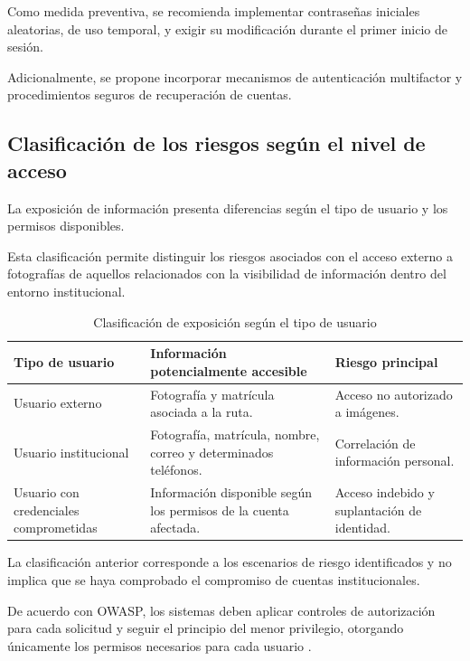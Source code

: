 \documentclass[12pt]{article}
\begin{document}
Como medida preventiva, se recomienda
implementar contraseñas iniciales
aleatorias, de uso temporal, y exigir
su modificación durante el primer
inicio de sesión.

Adicionalmente, se propone incorporar
mecanismos de autenticación multifactor
y procedimientos seguros de recuperación
de cuentas.


\subsection{Clasificación de los riesgos
según el nivel de acceso}

La exposición de información presenta
diferencias según el tipo de usuario
y los permisos disponibles.

Esta clasificación permite distinguir
los riesgos asociados con el acceso
externo a fotografías de aquellos
relacionados con la visibilidad
de información dentro del entorno
institucional.

\begin{table}[H]
\centering
\caption{Clasificación de exposición
según el tipo de usuario}
\label{tab:niveles_exposicion}
\small
\begin{tabularx}{\textwidth}{|X|X|X|}
\hline
\textbf{Tipo de usuario} &
\textbf{Información potencialmente accesible} &
\textbf{Riesgo principal} \\ \hline

Usuario externo &
Fotografía y matrícula
asociada a la ruta. &
Acceso no autorizado a imágenes. \\ \hline

Usuario institucional &
Fotografía, matrícula, nombre,
correo y determinados teléfonos. &
Correlación de información personal. \\ \hline

Usuario con credenciales comprometidas &
Información disponible según
los permisos de la cuenta afectada. &
Acceso indebido y suplantación
de identidad. \\ \hline

\end{tabularx}
\end{table}

La clasificación anterior corresponde
a los escenarios de riesgo identificados
y no implica que se haya comprobado
el compromiso de cuentas institucionales.

De acuerdo con OWASP, los sistemas deben
aplicar controles de autorización para
cada solicitud y seguir el principio
del menor privilegio, otorgando únicamente
los permisos necesarios para cada usuario
\parencite{owaspauth}.
\end{document}
